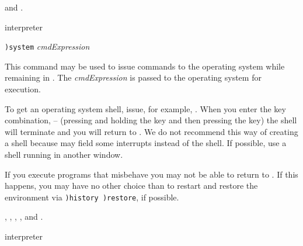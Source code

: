 {{{{{{{\par{}
 and
.



\par{} interpreter

\par{}
\begin{simpleList}
\item{\tt )system} {\it cmdExpression}
\end{simpleList}

\par{}

This command may be used to issue commands to the operating system while
remaining in \Language{}.
The {\it cmdExpression} is passed to the operating system for
execution.

To get an operating system shell, issue, for example,
.
When you enter the key combination,
--
(pressing and holding the
 key and then pressing the
 key)
the shell will terminate and you will return to \Language{}.
We do not recommend this way of creating a shell because
\Lisp{} may field some interrupts instead of the shell.
If possible, use a shell running in another window.

If you execute programs that misbehave you may not be able to return to
\Language{}.
If this happens, you may have no other choice than to restart
\Language{} and restore the environment via {\tt )history )restore}, if
possible.

\par{}
,
,
,
, and
.




\par{} interpreter

}}}}}}}
